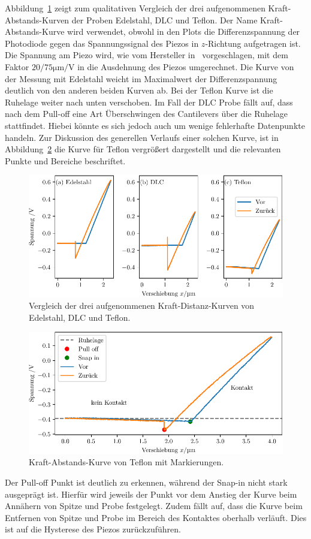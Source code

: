 Abbildung~\ref{fig: force_distance} zeigt zum qualitativen Vergleich der drei aufgenommenen Kraft-Abstands-Kurven der Proben
Edelstahl, DLC und Teflon. Der Name Kraft-Abstands-Kurve wird verwendet, obwohl in den Plots die Differenzspannung der Photodiode
gegen das Spannungssignal des Piezos in $z$-Richtung aufgetragen ist. Die Spannung am Piezo wird, wie vom Hersteller in~\cite{afm_datasheet}
vorgeschlagen, mit dem Faktor $20 / 75 \si{\micro\meter\per\volt}$ in die Ausdehnung des Piezos umgerechnet.
Die Kurve von der Messung mit Edelstahl weicht im Maximalwert der Differenzspannung deutlich von den anderen beiden Kurven ab. Bei der
Teflon Kurve ist die Ruhelage weiter nach unten verschoben.
Im Fall der DLC Probe fällt auf, dass nach dem Pull-off eine Art Überschwingen
des Cantilevers über die Ruhelage stattfindet. Hiebei könnte es sich jedoch auch um wenige fehlerhafte Datenpunkte handeln.
Zur Diskussion des generellen Verlaufs einer solchen Kurve, ist in Abbildung~\ref{fig: force_distance_teflon} die Kurve
für Teflon vergrößert dargestellt und die relevanten Punkte und Bereiche beschriftet.
\begin{figure}
  \centering
  \includegraphics[scale = 1]{../analysis/data/force_distance/force_distance.pdf}
  \caption{Vergleich der drei aufgenommenen Kraft-Distanz-Kurven von Edelstahl, DLC und Teflon.}
  \label{fig: force_distance}
\end{figure}
\begin{figure}
  \centering
  \includegraphics[scale = 1]{../analysis/data/force_distance/force_distance_teflon.pdf}
  \caption{Kraft-Abstands-Kurve von Teflon mit Markierungen.}
  \label{fig: force_distance_teflon}
\end{figure}
Der Pull-off Punkt ist deutlich zu erkennen, während der Snap-in nicht stark ausgeprägt ist. Hierfür wird
jeweils der Punkt vor dem Anstieg der Kurve beim Annähern von Spitze und Probe festgelegt. Zudem fällt auf, dass
die Kurve beim Entfernen von Spitze und Probe im Bereich des Kontaktes oberhalb verläuft. Dies ist auf die
Hysterese des Piezos zurückzuführen.

